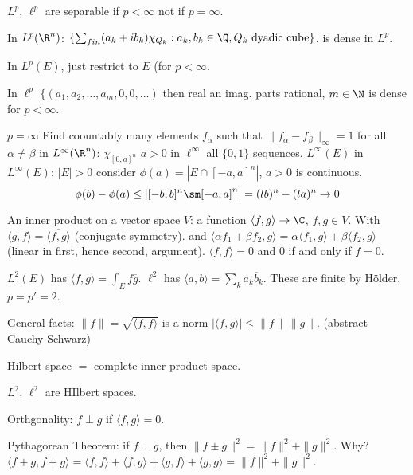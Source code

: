 \begin{thm}
$L^p$, $\ell^p$ are separable if $p<\infty$ not if $p=\infty$.

In $L^p(\R^n)$: $\{ \sum_{fin} (a_k+ib_k) \chi_{Q_k}: a_k,b_k \in \Q, Q_k \text{ dyadic cube}\}$. is dense in $L^p$.

In $L^p(E)$, just restrict to $E$ (for $p<\infty$.

In $\ell^p$ $\{(a_1,a_2,\ldots,a_m,0,0,\ldots)$ then real an imag. parts rational, $m \in \N$ is dense for $p<\infty$. 


$p=\infty$ Find coountably many elements $f_\alpha$ such that $\|f_\alpha-f_\beta\|_\infty=1$ for all $\alpha \neq \beta$ in $L^\infty(\R^n)$: $\chi_{[0,a]^n}$ $a>0$ in $\ell^\infty$ all $\{0,1\}$ sequences. $L^\infty(E)$ in $L^\infty(E)$: $|E|>0$ consider $\phi(a)= |E \cap [-a,a]^n|$, $a>0$ is continuous. 
	\[
	\phi(b)-\phi(a) \leq |[-b,b]^n \sm [-a,a]^n| = (lb)^n - (la)^n \to 0
	\] 
\end{thm}





An inner product on a vector space $V$: a function $\langle f,g \rangle \to \C$, $f,g \in V$. With $\langle g,f \rangle = \overline{\langle f,g \rangle}$ (conjugate symmetry). and $\langle \alpha f_1+\beta f_2, g \rangle = \alpha \langle f_1,g \rangle + \beta \langle f_2,g \rangle$ (linear in first, hence second, argument). $\langle f,f \rangle=0$ and $0$ if and only if $f=0$. 


\begin{ex}
$L^2(E)$ has $\langle f,g \rangle = \int_E f \overline{g}$. $\ell^2$ has $\langle a,b \rangle = \sum_k a_k \overline{b}_k$. These are finite by H\"older, $p=p'=2$. 
\end{ex}


General facts:
$\|f\|= \sqrt{ \langle f,f \rangle}$ is a norm
$|\langle f,g \rangle| \leq \|f\| \, \|g\|$. (abstract Cauchy-Schwarz)


Hilbert space $=$ complete inner product space.

$L^2$, $\ell^2$ are HIlbert spaces.

Orthgonality: $f \perp g$ if $\langle f,g \rangle= 0$. 

Pythagorean Theorem: if $f \perp g$, then $\|f \pm g\|^2 = \|f\|^2 + \|g\|^2$. Why? $\langle f+g, f+g \rangle= \langle f,f \rangle + \langle f,g \rangle + \langle g,f \rangle + \langle g,g \rangle= \|f\|^2 + \|g\|^2$. 

